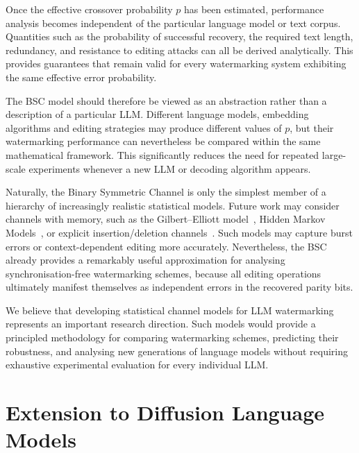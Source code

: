 \documentclass[a4paper,11pt]{llncs}
\begin{document}
Once the effective crossover probability $p$ has been estimated,
performance analysis becomes independent of the particular language model
or text corpus. Quantities such as the probability of successful
recovery, the required text length, redundancy, and resistance to
editing attacks can all be derived analytically. This provides guarantees
that remain valid for every watermarking system exhibiting the same
effective error probability.

The BSC model should therefore be viewed as an abstraction rather than a
description of a particular LLM. Different language models, embedding
algorithms and editing strategies may produce different values of $p$, but
their watermarking performance can nevertheless be compared within the
same mathematical framework. This significantly reduces the need for
repeated large-scale experiments whenever a new LLM or decoding algorithm
appears.

Naturally, the Binary Symmetric Channel is only the simplest member of a
hierarchy of increasingly realistic statistical models. Future work may
consider channels with memory, such as the Gilbert--Elliott
model~\cite{Gilbert1960,Elliott1963,Mushkin1989}, Hidden Markov
Models~\cite{Rabiner1989}, or explicit insertion/deletion
channels~\cite{Mitzenmacher2009,Morozov2024}. Such models may capture
burst errors or context-dependent editing more accurately. Nevertheless,
the BSC already provides a remarkably useful approximation for analysing
synchronisation-free watermarking schemes, because all editing operations
ultimately manifest themselves as independent errors in the recovered
parity bits.

We believe that developing statistical channel models for LLM
watermarking represents an important research direction. Such models would
provide a principled methodology for comparing watermarking schemes,
predicting their robustness, and analysing new generations of language
models without requiring exhaustive experimental evaluation for every
individual LLM.



\section{Extension to Diffusion Language Models}
\label{sec:diffusion}
\end{document}
